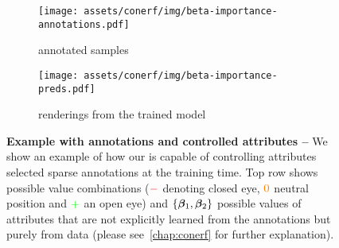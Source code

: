 \begin{figure}
  \centering
  \begin{subfigure}[t]{0.38\linewidth}
    \centering
    \texttt{[image: assets/conerf/img/beta-importance-annotations.pdf]}
    \caption{annotated samples}
  \end{subfigure}
  \hfill{}
  \begin{subfigure}[t]{0.595\linewidth}
    \centering
    \texttt{[image: assets/conerf/img/beta-importance-preds.pdf]}
    \caption{renderings from the trained model}
  \end{subfigure}
  \caption{{\bf Example with annotations and controlled attributes --}
    We show an example of how our \conerf is capable of controlling attributes
    selected sparse annotations at the training time.
    Top row shows possible value combinations ($\color{red}{-}$ denoting
    closed eye, $\color{orange}{0}$ neutral position and $\color{green}{+}$ an
    open eye) and $\{{\boldsymbol{\beta}}_1,{\boldsymbol{\beta}}_2\}$ possible values of attributes that
    are not explicitly learned from the annotations but purely from data
    (please see~\cref{chap:conerf} for further explanation).
  }
  \label{fig:early-conerf-teaser-intro}
\end{figure}